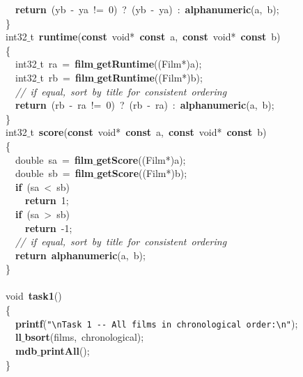 \documentclass{article}
\begin{document}
\mbox{}\ \ \textbf{return}\ (yb\ -\ ya\ !=\ 0)\ ?\ (yb\ -\ ya)\ :\ \textbf{alphanumeric}(a,\ b); \\
\mbox{}\} \\
\mbox{}int32$\_$t\ \textbf{runtime}(\textbf{const}\ void*\ \textbf{const}\ a,\ \textbf{const}\ void*\ \textbf{const}\ b) \\
\mbox{}\{ \\
\mbox{}\ \ int32$\_$t\ ra\ =\ \textbf{film$\_$getRuntime}((Film*)a); \\
\mbox{}\ \ int32$\_$t\ rb\ =\ \textbf{film$\_$getRuntime}((Film*)b); \\
\mbox{}\ \ \textit{//\ if\ equal,\ sort\ by\ title\ for\ consistent\ ordering} \\
\mbox{}\ \ \textbf{return}\ (rb\ -\ ra\ !=\ 0)\ ?\ (rb\ -\ ra)\ :\ \textbf{alphanumeric}(a,\ b); \\
\mbox{}\} \\
\mbox{}int32$\_$t\ \textbf{score}(\textbf{const}\ void*\ \textbf{const}\ a,\ \textbf{const}\ void*\ \textbf{const}\ b) \\
\mbox{}\{ \\
\mbox{}\ \ double\ sa\ =\ \textbf{film$\_$getScore}((Film*)a); \\
\mbox{}\ \ double\ sb\ =\ \textbf{film$\_$getScore}((Film*)b); \\
\mbox{}\ \ \textbf{if}\ (sa\ \textless{}\ sb) \\
\mbox{}\ \ \ \ \textbf{return}\ 1; \\
\mbox{}\ \ \textbf{if}\ (sa\ \textgreater{}\ sb) \\
\mbox{}\ \ \ \ \textbf{return}\ -1; \\
\mbox{}\ \ \textit{//\ if\ equal,\ sort\ by\ title\ for\ consistent\ ordering} \\
\mbox{}\ \ \textbf{return}\ \textbf{alphanumeric}(a,\ b); \\
\mbox{}\} \\
\mbox{} \\
\mbox{}void\ \textbf{task1}() \\
\mbox{}\{ \\
\mbox{}\ \ \textbf{printf}(\texttt{"{}}\texttt{\textbackslash{}n}\texttt{Task\ 1\ -\/-\ All\ films\ in\ chronological\ order:}\texttt{\textbackslash{}n}\texttt{"{}}); \\
\mbox{}\ \ \textbf{ll$\_$bsort}(films,\ chronological); \\
\mbox{}\ \ \textbf{mdb$\_$printAll}(); \\
\mbox{}\} \\
\end{document}
